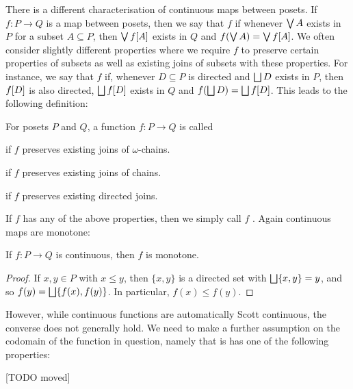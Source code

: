 \documentclass[a4paper, 11pt, article, danish, oneside]{memoir}
\DeclarePairedDelimiter{\auxdelimbracket}{[}{]}
\DeclareMathOperator*{\smallbigvee}{\textstyle\bigvee}
\DeclareMathOperator*{\bigjoin}{\mathchoice
    {\smallbigvee}%
    {\bigvee}%
    {\bigvee}%
    {\bigvee}%
}
\DeclareMathOperator*{\smallbigsqcup}{\textstyle\bigsqcup}
\DeclareMathOperator*{\bigdjoin}{\mathchoice
    {\smallbigsqcup}%
    {\bigsqcup}%
    {\bigsqcup}%
    {\bigsqcup}%
}
\newcommand{\image}[2][]{\auxdelimbracket[#1]{#2}}
\begin{document}
There is a different characterisation of continuous maps between posets. If $f \colon P \to Q$ is a map between posets, then we say that $f$  if whenever $\bigjoin A$ exists in $P$ for a subset $A \subseteq P$, then $\bigjoin f\image{A}$ exists in $Q$ and $f(\bigjoin A) = \bigjoin f\image{A}$. We often consider slightly different properties where we require $f$ to preserve certain properties of subsets as well as existing joins of subsets with these properties. For instance, we say that $f$  if, whenever $D \subseteq P$ is directed and $\bigdjoin D$ exists in $P$, then $f\image{D}$ is also directed, $\bigdjoin f\image{D}$ exists in $Q$ and $f(\bigdjoin D) = \bigdjoin f\image{D}$. This leads to the following definition:

\begin{definition}
    For posets $P$ and $Q$, a function $f \colon P \to Q$ is called
    \begin{enumdef}
        \item {} if $f$ preserves existing joins of $\omega$-chains.
        
        \item {} if $f$ preserves existing joins of chains.
        
        \item {} if $f$ preserves existing directed joins.
    \end{enumdef}
\end{definition}
%
If $f$ has any of the above properties, then we simply call $f$ . Again continuous maps are monotone:

\begin{lemma}
    If $f \colon P \to Q$ is continuous, then $f$ is monotone.
\end{lemma}

\begin{proof}
    If $x,y \in P$ with $x \leq y$, then $\{x,y\}$ is a directed set with $\bigdjoin \{x,y\} = y$, and so $f(y) = \bigdjoin \{f(x),f(y)\}$. In particular, $f(x) \leq f(y)$.
\end{proof}
%
However, while continuous functions are automatically Scott continuous, the converse does not generally hold. We need to make a further assumption on the codomain of the function in question, namely that is has one of the following properties:

[TODO moved]
\end{document}
